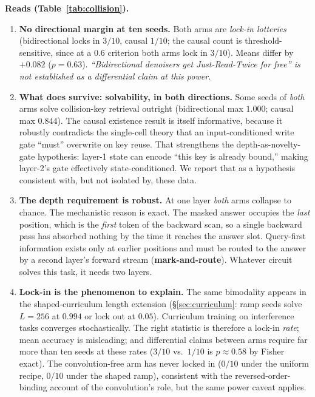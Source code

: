 \documentclass{article}
\begin{document}
\textbf{Reads (Table~\ref{tab:collision}).}
\begin{enumerate}[leftmargin=1.4em,itemsep=2pt]
\item \textbf{No directional margin at ten seeds.} Both arms are \emph{lock-in lotteries} (bidirectional locks in $3/10$, causal $1/10$; the causal count is threshold-sensitive, since at a $0.6$ criterion both arms lock in $3/10$). Means differ by $+0.082$ ($p{=}0.63$). \emph{``Bidirectional denoisers get Just-Read-Twice for free'' is not established as a differential claim at this power.}
\item \textbf{What does survive: solvability, in both directions.} Some seeds of \emph{both} arms solve collision-key retrieval outright (bidirectional max $1.000$; causal max $0.844$). The causal existence result is itself informative, because it robustly contradicts the single-cell theory that an input-conditioned write gate ``must'' overwrite on key reuse. That strengthens the depth-as-novelty-gate hypothesis: layer-1 state can encode ``this key is already bound,'' making layer-2's gate effectively state-conditioned. We report that as a hypothesis consistent with, but not isolated by, these data.
\item \textbf{The depth requirement is robust.} At one layer \emph{both} arms collapse to chance. The mechanistic reason is exact. The masked answer occupies the \emph{last} position, which is the \emph{first} token of the backward scan, so a single backward pass has absorbed nothing by the time it reaches the answer slot. Query-first information exists only at earlier positions and must be routed to the answer by a second layer's forward stream (\textbf{mark-and-route}). Whatever circuit solves this task, it needs two layers.
\item \textbf{Lock-in is the phenomenon to explain.} The same bimodality appears in the shaped-curriculum length extension (\S\ref{sec:curriculum}: ramp seeds solve $L{=}256$ at $0.994$ or lock out at $0.05$). Curriculum training on interference tasks converges stochastically. The right statistic is therefore a lock-in \emph{rate}; mean accuracy is misleading; and differential claims between arms require far more than ten seeds at these rates ($3/10$ vs.\ $1/10$ is $p{\approx}0.58$ by Fisher exact). The convolution-free arm has never locked in ($0/10$ under the uniform recipe, $0/10$ under the shaped ramp), consistent with the reversed-order-binding account of the convolution's role, but the same power caveat applies.
\end{enumerate}
\end{document}

